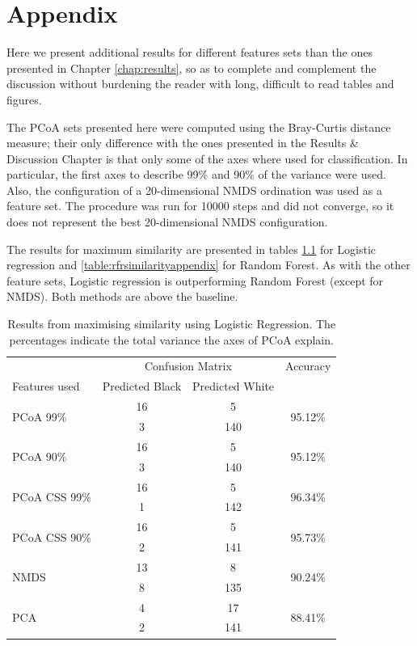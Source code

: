 \chapter{Appendix} 
\ifpdf
\graphicspath{{Chapter3/Figs/Raster/}{Chapter3/Figs/PDF/}{Chapter3/Figs/}}
\else
\graphicspath{{Chapter3/Figs/Vector/}{Chapter3/Figs/}}
\fi
Here we present additional results for different features sets than the ones presented in Chapter \ref{chap:results}, so as to complete and complement the discussion without burdening the reader with long, difficult to read tables and figures.

The PCoA sets presented here were computed using the Bray-Curtis distance measure; their only difference with the ones presented in the Results \& Discussion Chapter is that only some of the axes where used for classification. In particular, the first axes to describe 99\% and 90\% of the variance were used. Also, the configuration of a 20-dimensional NMDS ordination was used as a feature set. The procedure was run for 10000 steps and did not converge, so it does not represent the best 20-dimensional NMDS configuration.


The results for maximum similarity are presented in tables \ref{table:lrsimilarityappendix} for Logistic regression and \ref{table:rfrsimilarityappendix} for Random Forest. As with the other feature sets, Logistic regression is outperforming Random Forest (except for NMDS). Both methods are above the baseline.
\begin{table}[h]
	\centering
	\begin{tabular}{l c  c c}
		\toprule
		&\multicolumn{2}{c}{Confusion Matrix} & Accuracy\\
		Features used & Predicted Black&Predicted White&\\
		\midrule
		\multirow{2}{*}{PCoA 99\%} &16 &5&\multirow{2}{*}{95.12\%}\\
		&	 3&140&\\
		\cmidrule{2-3}
		\multirow{2}{*}{PCoA 90\%} &16 &5&\multirow{2}{*}{95.12\%}\\
		&	 3&140&\\
		\cmidrule{2-3}
		\multirow{2}{*}{PCoA CSS 99\%} &16 &5&\multirow{2}{*}{96.34\%}\\
		&	 1&142&\\
		\cmidrule{2-3}
		\multirow{2}{*}{PCoA CSS 90\%} &16 &5&\multirow{2}{*}{95.73\%}\\
		&	 2&141&\\
		\cmidrule{2-3}
		\multirow{2}{*}{NMDS}&13 &8&\multirow{2}{*}{90.24\%}\\
		&	 8&135&\\
				\cmidrule{2-3}
		\multirow{2}{*}{PCA}&4 &17&\multirow{2}{*}{88.41\%}\\
		&	 2&141&\\
		\bottomrule
	\end{tabular}
	\caption{Results from maximising similarity using Logistic Regression. The percentages indicate the total variance the axes of PCoA explain.}
	\label{table:lrsimilarityappendix}
\end{table}

